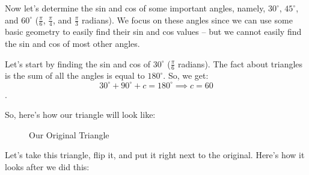 \label{les_6:part_3_intro_to_trig_functions}

Now let's determine the sin and cos of some important angles, namely,
$30^{\circ}$, $45^{\circ}$, and $60^{\circ}$ ($\frac{\pi}{6}$, $\frac{\pi}{4}$,
and $\frac{\pi}{3}$ radians). We focus on these angles since we can use some
basic geometry to easily find their sin and cos values -- but we cannot easily
find the sin and cos of most other angles.

Let's start by finding the sin and cos of $30^{\circ}$ ($\frac{\pi}{6}$
radians). The fact about triangles is the sum of all the angles is equal to
$180^{\circ}$. So, we get:
\[ 30^{\circ} + 90^{\circ} + c = 180^{\circ} \implies c = 60 \].

So, here's how our triangle will look like:

\begin{figure}[htpb]
  \label{fig:30_60_90_triangle}
  \centering


  \caption{Our Original Triangle}
\end{figure}

Let's take this triangle, flip it, and put it right next to the original. Here's
how it looks after we did this:


